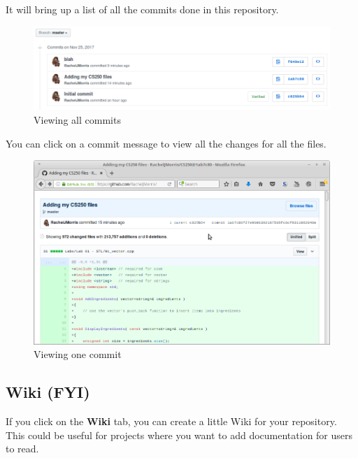 \documentclass[a4paper,12pt,oneside]{book}
\begin{document}
        It will bring up a list of all the commits done in this repository.

        \begin{figure}[h]
            \centering
            \includegraphics[width=14cm]{images/github-commits2.png}
            \caption{Viewing all commits}
        \end{figure}

        You can click on a commit message to view all the changes for all
        the files.

        \begin{figure}[h]
            \centering
            \includegraphics[width=14cm]{images/github-commits3.png}
            \caption{Viewing one commit}
        \end{figure}

    \newpage

    \subsection{Wiki (FYI)}

        If you click on the \textbf{Wiki} tab, you can create a little
        Wiki for your repository. This could be useful for projects
        where you want to add documentation for users to read.
\end{document}
